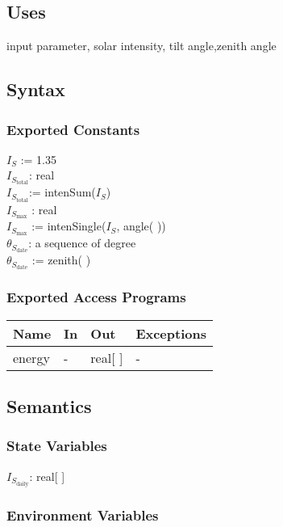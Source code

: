 \documentclass[12pt, titlepage]{article}
\begin{document}
\subsection{Uses}
input parameter, solar intensity, tilt angle,zenith angle\\

\subsection{Syntax}

\subsubsection{Exported Constants}

$I_{S}$ := 1.35\\
$I_{S_{\text{total}}}$: real\\
$I_{S_{\text{total}}}$:= intenSum($I_{S}$)\\
$I_{S_{\text{max}}}$ : real\\
$I_{S_{\text{max}}}$
 := intenSingle($I_{S}$, angle( ))\\
$\theta_{S_{\text{date}}}$: a sequence of degree\\
$\theta_{S_{\text{date}}}$ := zenith( )\\
\subsubsection{Exported Access Programs}

\begin{center}
\begin{tabular}{p{2cm} p{4cm} p{4cm} p{2cm}}
\hline
\textbf{Name} & \textbf{In} & \textbf{Out} & \textbf{Exceptions} \\
\hline 
energy & - & real[ ] & - \\

\hline
\end{tabular}
\end{center}


\subsection{Semantics}

\subsubsection{State Variables}
$I_{S_{\text{daily}}}$: real[ ]

\subsubsection{Environment Variables}
\end{document}
